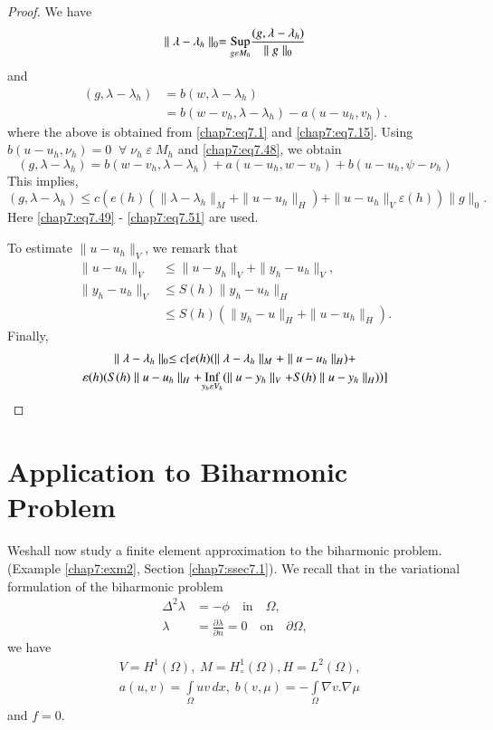 \begin{proof}
We have 
$$
\parallel\lambda-\lambda_h\parallel_0=\underset{g\varepsilon M_0}
{\operatorname{Sup}}\frac{(g,\lambda-\lambda_h)}{\parallel g\parallel_0}
$$\pageoriginale
and
\begin{align*}
(g,\lambda-\lambda_h) &= b(w,\lambda-\lambda_h)\\
&= b(w-v_h,\lambda-\lambda_h)-a(u-u_h, v_h).
\end{align*}
where the above is obtained from \eqref{chap7:eq7.1} and
\eqref{chap7:eq7.15}. Using $b(u-u_h,\nu_h)=0 \; \; \forall \;\nu_h
\;\varepsilon \;M_h$ and \eqref{chap7:eq7.48}, we obtain 
$$
(g,\lambda-\lambda_h)=b(w-v_h,\lambda-\lambda_h)+a(u-u_h,w-v_h)+b(u-u_h,
\psi-\nu_h) 
$$
This implies,
$$
(g,\lambda-\lambda_h)\leq c(e(h)(\parallel\lambda-\lambda_h\parallel_M
+\parallel u-u_h\parallel_H)+\parallel u-u_h\parallel_V \varepsilon
(h))\parallel g\parallel_0.
$$
Here \eqref{chap7:eq7.49} - \eqref{chap7:eq7.51} are used. 

To estimate $\parallel u-u_h\parallel_V$, we remark that 
\begin{align*}
\parallel u-u_h\parallel_V &\leq\parallel u-y_h\parallel_V+ \parallel
y_h-u_h\parallel_V,\\
\parallel y_h-u_h\parallel_V &\leq S(h)\parallel y_h-u_h\parallel_H\\ 
&\leq S(h)(\parallel y_h-u\parallel_H +\parallel u-u_h\parallel_H). 
\end{align*}
Finally,
\begin{gather*}
\parallel\lambda-\lambda_h\parallel_0\leq c[e(h)(\parallel\lambda-
\lambda_h\parallel_M+\parallel u-u_h\parallel_H)+\\
\varepsilon(h)(S(h)\parallel u-u_h\parallel_H+
\underset{y_h\varepsilon V_h}{\operatorname{Inf}}(\parallel u-y_h\parallel_V+
S(h)\parallel u-y_h\parallel_H))]
\end{gather*}
\end{proof}

\section{Application to Biharmonic  Problem} \label{chap7:ssec7.8} We\pageoriginale shall now study a
finite element approximation to the biharmonic problem. (Example
\ref{chap7:exm2}, Section \ref{chap7:ssec7.1}). We recall that in the
variational formulation of the biharmonic problem 
\begin{align*}
\Delta^2\lambda &= -\phi\quad\text{in}\quad\Omega,\\
\lambda &= \frac{\partial\lambda}{\partial n}=0\quad\text{on}
\quad\partial\Omega, 
\end{align*}
we have 
\begin{align*}
&V=H^1(\Omega),\;M=H_\circ^1(\Omega), H=L^2(\Omega),\\
&a(u,v)=\int\limits_\Omega uv\,dx,\;b(v,\mu)=- \int\limits_\Omega
\nabla v.\nabla\mu
\end{align*}
and $f=0$.

